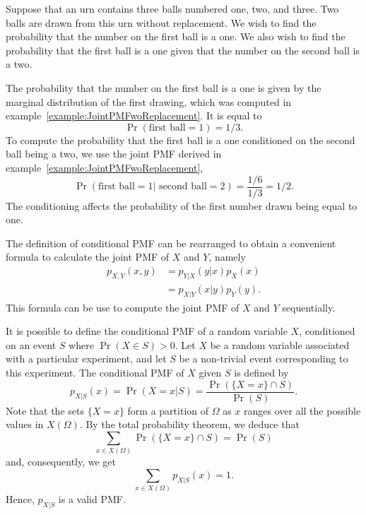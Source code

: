 \begin{example}
Suppose that an urn contains three balls numbered one, two, and three.
Two balls are drawn from this urn without replacement.
We wish to find the probability that the number on the first ball is a one.
We also wish to find the probability that the first ball is a one given that the number on the second ball is a two.

The probability that the number on the first ball is a one is given by the marginal distribution of the first drawing, which was computed in example~\ref{example:JointPMFwoReplacement}.
It is equal to
\begin{equation*}
\Pr ( \text{first ball} = 1) = 1/3.
\end{equation*}
To compute the probability that the first ball is a one conditioned on the second ball being a two, we use the joint PMF derived in example~\ref{example:JointPMFwoReplacement},
\begin{equation*}
\Pr (\text{first ball} =1 | \text{ second ball} =2) = \frac{1/6}{1/3} = 1/2 .
\end{equation*}
The conditioning affects the probability of the first number drawn being equal to one.
\end{example}

The definition of conditional PMF can be rearranged to obtain a convenient formula to calculate the joint PMF of $X$ and $Y$, namely
\begin{equation*}
\begin{split}
p_{X,Y} (x,y) &= p_{Y|X} (y|x) p_X (x) \\
& = p_{X|Y} (x|y) p_Y (y) .
\end{split}
\end{equation*}
This formula can be use to compute the joint PMF of $X$ and $Y$ sequentially.


It is possible to define the conditional PMF of a random variable $X$, conditioned on an event $S$ where $\Pr (X \in S) > 0$.
Let $X$ be a random variable associated with a particular experiment, and let $S$ be a non-trivial event corresponding to this experiment.
The conditional PMF of $X$ given $S$ is defined by
\begin{equation} \label{equation:ConditionalEventPMF}
p_{X|S} (x) = \Pr (X = x | S)
= \frac{\Pr (\{X = x\} \cap S)}{\Pr (S)} .
\end{equation}
Note that the sets $\{ X = x \}$ form a partition of $\Omega$ as $x$ ranges over all the possible values in $X (\Omega)$.
By the total probability theorem, we deduce that
\begin{equation*}
\sum_{x \in X(\Omega)} \Pr ( \{X = x\} \cap S) = \Pr (S)
\end{equation*}
and, consequently, we get
\begin{equation*}
\sum_{x \in X(\Omega)} p_{X|S} (x) = 1 .
\end{equation*}
Hence, $p_{X|S}$ is a valid PMF.

